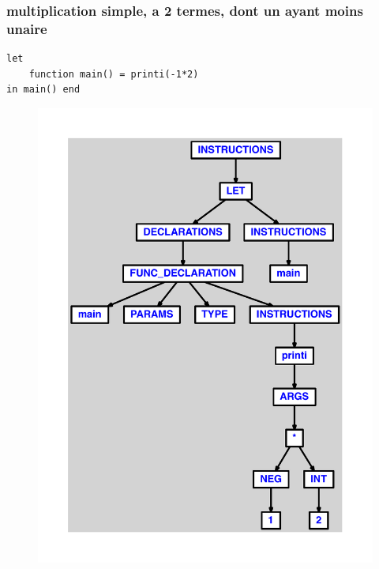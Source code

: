 \documentclass{article}
\begin{document}
\subsubsection{multiplication simple, a 2 termes, dont un ayant moins unaire}
\begin{lstlisting}
let
	function main() = printi(-1*2)
in main() end
\end{lstlisting}
\newpage
\begin{figure}[H]
\centering
\includegraphics[max width=\textwidth]{ast/ast_65.pdf}
\end{figure}
\newpage
\end{document}
